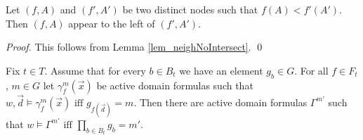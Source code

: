 \documentclass[envcountsame]{llncs}
\begin{document}
\begin{lemma} \label{lem_tree}
Let $(f,A)$ and $(f',A')$ be two distinct nodes such that $f(A)<f'(A')$. Then $(f,A)$ appear to the left of $(f',A')$.
\end{lemma}
\begin{proof}
This follows from Lemma \ref{lem_neighNoIntersect}.
\qed \end{proof}



\begin{lemma}\label{lem_treelemma}
Fix $t\in T$. Assume that for every $b\in B_{t}$ we have an element $g_b\in G$.
For all $f\in F_t$, $m\in G$ let $\gamma_f^m(\vec x)$ be active domain formulas  such that $w,\vec d\models\gamma_f^m(\vec x)\text{ iff }g_{f(\vec d)}=m.$
Then there are active domain formulas $\Gamma^{m'}$ such that $w\models\Gamma^{m'}\text{ iff }\prod_{b\in B_t} g_b=m'.$
\end{lemma}
\end{document}
